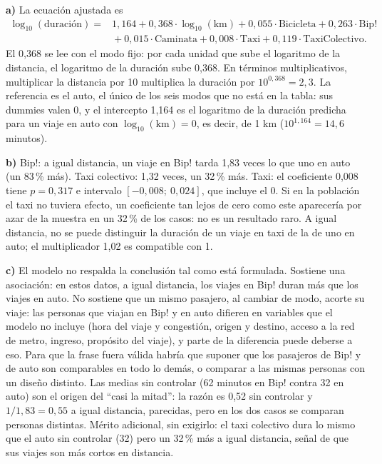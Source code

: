 \documentclass[11pt]{article}
\begin{document}
\textbf{a)} La ecuación ajustada es
\begin{align*}
\log_{10}(\text{duración}) ={}& 1{,}164 + 0{,}368 \cdot \log_{10}(\text{km}) + 0{,}055 \cdot \text{Bicicleta} + 0{,}263 \cdot \text{Bip!} \\
& {}+ 0{,}015 \cdot \text{Caminata} + 0{,}008 \cdot \text{Taxi} + 0{,}119 \cdot \text{TaxiColectivo}.
\end{align*}
El 0,368 se lee con el modo fijo: por cada unidad que sube el logaritmo de la distancia, el logaritmo de la duración sube 0,368. En términos multiplicativos, multiplicar la distancia por 10 multiplica la duración por $10^{0{,}368} = 2{,}3$. La referencia es el auto, el único de los seis modos que no está en la tabla: sus dummies valen 0, y el intercepto 1,164 es el logaritmo de la duración predicha para un viaje en auto con $\log_{10}(\text{km}) = 0$, es decir, de 1 km ($10^{1{,}164} = 14{,}6$ minutos).

\medskip
\textbf{b)} Bip!: a igual distancia, un viaje en Bip! tarda 1,83 veces lo que uno en auto (un 83\,\% más). Taxi colectivo: 1,32 veces, un 32\,\% más. Taxi: el coeficiente 0,008 tiene $p = 0{,}317$ e intervalo $[-0{,}008;\ 0{,}024]$, que incluye el 0. Si en la población el taxi no tuviera efecto, un coeficiente tan lejos de cero como este aparecería por azar de la muestra en un 32\,\% de los casos: no es un resultado raro. A igual distancia, no se puede distinguir la duración de un viaje en taxi de la de uno en auto; el multiplicador 1,02 es compatible con 1.

\medskip
\textbf{c)} El modelo no respalda la conclusión tal como está formulada. Sostiene una asociación: en estos datos, a igual distancia, los viajes en Bip! duran más que los viajes en auto. No sostiene que un mismo pasajero, al cambiar de modo, acorte su viaje: las personas que viajan en Bip! y en auto difieren en variables que el modelo no incluye (hora del viaje y congestión, origen y destino, acceso a la red de metro, ingreso, propósito del viaje), y parte de la diferencia puede deberse a eso. Para que la frase fuera válida habría que suponer que los pasajeros de Bip! y de auto son comparables en todo lo demás, o comparar a las mismas personas con un diseño distinto. Las medias sin controlar (62 minutos en Bip! contra 32 en auto) son el origen del ``casi la mitad'': la razón es 0,52 sin controlar y $1/1{,}83 = 0{,}55$ a igual distancia, parecidas, pero en los dos casos se comparan personas distintas. Mérito adicional, sin exigirlo: el taxi colectivo dura lo mismo que el auto sin controlar (32) pero un 32\,\% más a igual distancia, señal de que sus viajes son más cortos en distancia.
\end{document}
